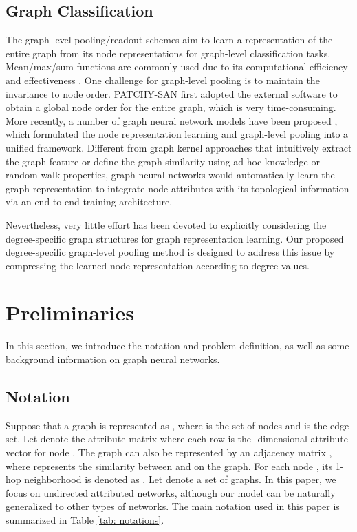\documentclass[sigconf]{acmart}
\begin{document}
\subsection{Graph Classification}
The graph-level pooling/readout schemes aim to learn a representation of the entire graph from its node representations for graph-level classification tasks. Mean/max/sum functions are commonly used due to its computational efficiency and effectiveness \cite{atwood2016diffusion, xu2018powerful}. One challenge for graph-level pooling is to maintain the invariance to node order. PATCHY-SAN \cite{niepert2016learning} first adopted the external software to obtain a global node order for the entire graph, which is very time-consuming. More recently, a number of graph neural network models have been proposed \cite{zhang2018end, xu2018powerful, ying2018hierarchical}, which formulated the node representation learning and graph-level pooling into a unified framework. Different from graph kernel approaches \cite{shervashidze2011weisfeiler, yanardag2015deep} that intuitively extract the graph feature or define the graph similarity using ad-hoc knowledge or random walk properties, graph neural networks would automatically learn the graph representation to integrate node attributes with its topological information via an end-to-end training architecture.

Nevertheless, very little effort has been devoted to explicitly considering the degree-specific graph structures for graph representation learning. Our proposed degree-specific graph-level pooling method is designed to address this issue by compressing the learned node representation according to degree values.

\section{Preliminaries}
In this section, we introduce the notation and problem definition, as well as some background information on graph neural networks.

\subsection{Notation}
Suppose that a graph is represented as , where  is the set of  nodes and  is the edge set. Let  denote the attribute matrix where each row  is the -dimensional attribute vector for node . The graph  can also be represented by an adjacency matrix , where  represents the similarity between  and  on the graph. For each node , its 1-hop neighborhood is denoted as .
Let  denote a set of graphs. In this paper, we focus on undirected attributed networks, although our model can be naturally generalized to other types of networks. The main notation used in this paper is summarized in Table \ref{tab: notations}.
\end{document}
